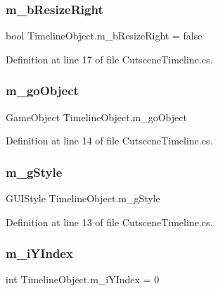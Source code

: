 \subsubsection{\texorpdfstring{m\+\_\+b\+Resize\+Right}{m\_bResizeRight}}
{\footnotesize\ttfamily bool Timeline\+Object.\+m\+\_\+b\+Resize\+Right = false}



Definition at line 17 of file Cutscene\+Timeline.\+cs.

\mbox{\label{class_timeline_object_acff17e517d9966b24e84f4f0890a50fe}} 
\subsubsection{\texorpdfstring{m\+\_\+go\+Object}{m\_goObject}}
{\footnotesize\ttfamily Game\+Object Timeline\+Object.\+m\+\_\+go\+Object}



Definition at line 14 of file Cutscene\+Timeline.\+cs.

\mbox{\label{class_timeline_object_aa948d48e3b99e0430b96b886953d8652}} 
\subsubsection{\texorpdfstring{m\+\_\+g\+Style}{m\_gStyle}}
{\footnotesize\ttfamily G\+U\+I\+Style Timeline\+Object.\+m\+\_\+g\+Style}



Definition at line 13 of file Cutscene\+Timeline.\+cs.

\mbox{\label{class_timeline_object_ac6265747bd860e2a215da19c8ffbc45e}} 
\subsubsection{\texorpdfstring{m\+\_\+i\+Y\+Index}{m\_iYIndex}}
{\footnotesize\ttfamily int Timeline\+Object.\+m\+\_\+i\+Y\+Index = 0}



